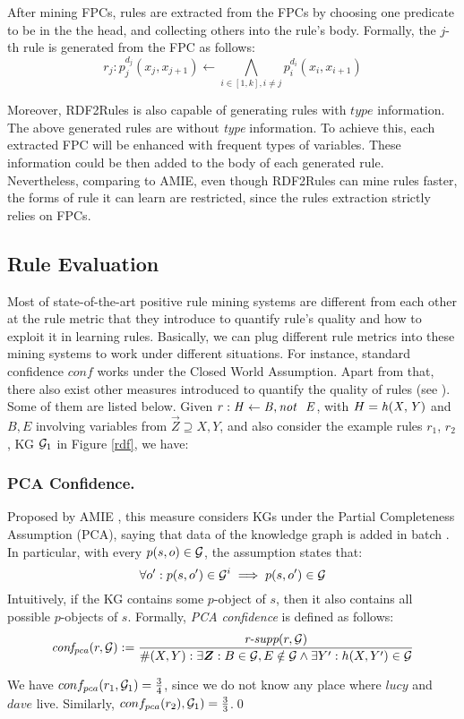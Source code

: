 After mining FPCs, rules are extracted from the FPCs by choosing one %
predicate to be in the 
the head, and collecting others into the rule's  body. 
Formally, the  $j$-th rule is generated from the FPC as follows:
\[r_j: p_j^{d_j}(x_j,x_{j+1}) \leftarrow \underset{i \in [1,k], i \ne j}{\bigwedge} p_i^{d_i}(x_i,x_{i+1}) \]

Moreover, RDF2Rules is also capable of generating rules with $type$ information. The above generated rules are without \textit{type} information. To achieve this, each extracted FPC will be enhanced with frequent types of variables. These information could be then added to the body of each generated rule. Nevertheless, comparing to AMIE, even though RDF2Rules can mine rules faster, the forms of rule it can learn are restricted, since the rules extraction strictly relies on FPCs.

\subsection{Rule Evaluation}
Most of state-of-the-art positive rule mining systems are different from each other at the rule metric that they introduce to quantify rule's quality and how to exploit it in learning rules. Basically, we can plug different rule metrics into these mining systems to work under different situations. For instance, standard confidence $conf$ works under the Closed World Assumption. Apart from that, there also exist other measures introduced to quantify the quality of rules (see \cite{metrics-summary}). Some of them are listed below. Given $r:\mathit{H\leftarrow B, \mathit{not}~ \ E}$, with $H=\mathit{h(X,Y)}$ and $B,E$ involving variables from $\vec{Z}\supseteq X,Y$, and also consider the example rules $r_1$, $r_2$, KG $\mathcal{G}_1$ in Figure \ref{rdf}, we have:
\subsubsection{PCA Confidence.} Proposed by AMIE \cite{amie}, this measure considers KGs under the Partial Completeness Assumption (PCA), saying that data of the knowledge graph is added in batch \cite{amie}. In particular, with every $p(s,o) \in \mathcal{G}$, the assumption states that:
\[\forall o' : p(s,o') \in \mathcal{G}^i \implies p(s,o') \in \mathcal{G}\]
Intuitively, if the KG contains some $p$-object of $s$, then it also contains all possible $p$-objects of $s$. Formally, \textit{PCA confidence} is defined as follows:
\[
\mi{conf_{pca}}(r, \cG) := \frac{\textit{r-supp}(r, \cG)}{\#(X,Y): \exists \vec{Z}: B \in \cG, E \notin \cG  \wedge \exists Y': h(X,Y')\in \cG}
\]
\begin{example}
We have $conf_{pca}(r_1,\mathcal{G}_1) = \frac{3}{4}$, since we do not know any place where $lucy$ and $dave$ live. Similarly, $conf_{pca}(r_2),\mathcal{G}_1) = \frac{3}{3}$.\qed
\end{example}
